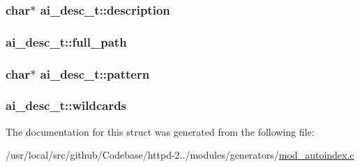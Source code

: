 \subsubsection[{\texorpdfstring{description}{description}}]{\setlength{\rightskip}{0pt plus 5cm}char$\ast$ ai\+\_\+desc\+\_\+t\+::description}\hypertarget{structai__desc__t_a9357ade1811defeb6105963ae7f16689}{}\label{structai__desc__t_a9357ade1811defeb6105963ae7f16689}
\subsubsection[{\texorpdfstring{full\+\_\+path}{full_path}}]{ ai\+\_\+desc\+\_\+t\+::full\+\_\+path}\hypertarget{structai__desc__t_a4bb904b05c7eb1b466466646e2666006}{}\label{structai__desc__t_a4bb904b05c7eb1b466466646e2666006}
\subsubsection[{\texorpdfstring{pattern}{pattern}}]{\setlength{\rightskip}{0pt plus 5cm}char$\ast$ ai\+\_\+desc\+\_\+t\+::pattern}\hypertarget{structai__desc__t_a6d8fa38acdb07391178bca525384a526}{}\label{structai__desc__t_a6d8fa38acdb07391178bca525384a526}
\subsubsection[{\texorpdfstring{wildcards}{wildcards}}]{ ai\+\_\+desc\+\_\+t\+::wildcards}\hypertarget{structai__desc__t_a504e39a8861f08b50aa86a875dcd6df6}{}\label{structai__desc__t_a504e39a8861f08b50aa86a875dcd6df6}


The documentation for this struct was generated from the following file\+:\begin{DoxyCompactItemize}
\item 
/usr/local/src/github/\+Codebase/httpd-\/2../modules/generators/\hyperlink{mod__autoindex_8c}{mod\+\_\+autoindex.\+c}\end{DoxyCompactItemize}

